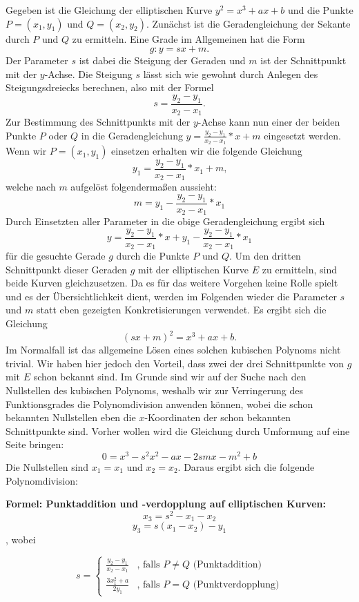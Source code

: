 Gegeben ist die Gleichung der elliptischen Kurve $y^2 = x^3 +ax + b$ und die Punkte $P = (x_1, y_1)$ und $Q = (x_2, y_2)$. Zunächst ist die Geradengleichung der Sekante durch $P$ und $Q$ zu ermitteln. Eine Grade im Allgemeinen hat die Form $$g: y = sx + m.$$ Der Parameter $s$ ist dabei die Steigung der Geraden und $m$ ist der Schnittpunkt mit der $y$-Achse. Die Steigung $s$ lässt sich wie gewohnt durch Anlegen des Steigungsdreiecks berechnen, also mit der Formel $$s = \frac{y_2 - y_1}{x_2  - x_1}.$$
Zur Bestimmung des Schnittpunkts mit der $y$-Achse kann nun einer der beiden Punkte $P$ oder $Q$ in die Geradengleichung $y = \frac{y_2 - y_1}{x_2  - x_1} * x + m$ eingesetzt werden. Wenn wir $P = (x_1, y_1)$ einsetzen erhalten wir die folgende Gleichung $$y_1 = \frac{y_2 - y_1}{x_2  - x_1} * x_1 + m\text{,}$$ welche nach $m$ aufgelöst folgendermaßen aussieht: $$m = y_1 - \frac{y_2 - y_1}{x_2  - x_1} * x_1$$
Durch Einsetzten aller Parameter in die obige Geradengleichung ergibt sich $$y = \frac{y_2 - y_1}{x_2  - x_1} * x + y_1 - \frac{y_2 - y_1}{x_2  - x_1} * x_1$$ für die gesuchte Gerade $g$ durch die Punkte $P$ und $Q$. Um den dritten Schnittpunkt dieser Geraden $g$ mit der elliptischen Kurve $E$ zu ermitteln, sind beide Kurven gleichzusetzen. Da es für das weitere Vorgehen keine Rolle spielt und es der Übersichtlichkeit dient, werden im Folgenden wieder die Parameter $s$ und $m$ statt eben gezeigten Konkretisierungen verwendet. Es ergibt sich die Gleichung $$(sx+m)^2 = x^3 + ax + b\text{.}$$ Im Normalfall ist das allgemeine Lösen eines solchen kubischen Polynoms nicht trivial. Wir haben hier jedoch den Vorteil, dass zwei der drei Schnittpunkte von $g$ mit $E$ schon bekannt sind. Im Grunde sind wir auf der Suche nach den Nullstellen des kubischen Polynoms, weshalb wir zur Verringerung des Funktionsgrades die Polynomdivision anwenden können, wobei die schon bekannten Nullstellen eben die $x$-Koordinaten der schon bekannten Schnittpunkte sind. Vorher wollen wird die Gleichung durch Umformung auf eine Seite bringen: $$0 =  x^3 - s^2x^2-ax-2smx-m^2+b$$
Die Nullstellen sind $x_1 = x_1$ und $x_2 = x_2$.
Daraus ergibt sich die folgende Polynomdivision:



\textbf{Formel: Punktaddition und -verdopplung auf elliptischen Kurven:}
$$x_3 = s^2 - x_1 - x_2$$
$$y_3 = s(x_1 - x_2) - y_1$$,
wobei

$$s = \begin{cases}
	\frac{y_2 - y_1}{x_2 -x_1} & \text{, falls } P \neq Q \text{ (Punktaddition)}\\
	\frac{3x_1^2 + a}{2y_1} & \text{, falls } P = Q \text{ (Punktverdopplung)}
	\end{cases}
$$

